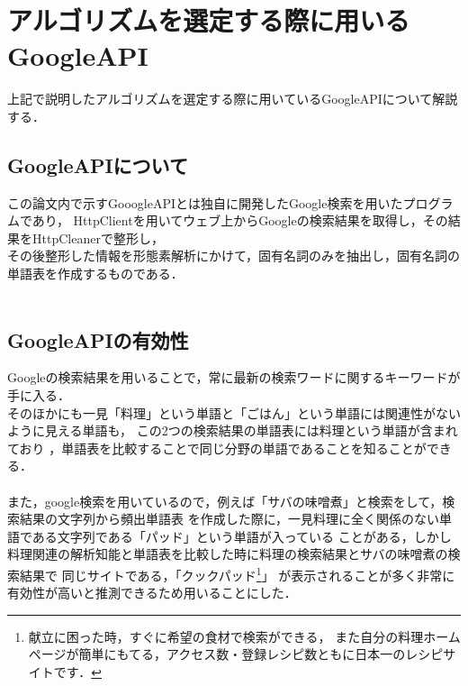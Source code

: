 \section{アルゴリズムを選定する際に用いるGoogleAPI}
上記で説明したアルゴリズムを選定する際に用いているGoogleAPIについて解説する．\\

\subsection{GoogleAPIについて}
この論文内で示すGooogleAPIとは独自に開発したGoogle検索を用いたプログラムであり，
HttpClientを用いてウェブ上からGoogleの検索結果を取得し，その結果をHttpCleanerで整形し，\\
その後整形した情報を形態素解析にかけて，固有名詞のみを抽出し，固有名詞の単語表を作成するものである．\\
\\

\subsection{GoogleAPIの有効性}
Googleの検索結果を用いることで，常に最新の検索ワードに関するキーワードが手に入る．
\\
そのほかにも一見「料理」という単語と「ごはん」という単語には関連性がないように見える単語も，
この2つの検索結果の単語表には料理という単語が含まれており
，単語表を比較することで同じ分野の単語であることを知ることができる．\\
\\
また，google検索を用いているので，例えば「サバの味噌煮」と検索をして，検索結果の文字列から頻出単語表
を作成した際に，一見料理に全く関係のない単語である文字列である「パッド」という単語が入っている
ことがある，しかし料理関連の解析知能と単語表を比較した時に料理の検索結果とサバの味噌煮の検索結果で
同じサイトである，「クックパッド\footnote{献立に困った時，すぐに希望の食材で検索ができる，
また自分の料理ホームページが簡単にもてる，アクセス数・登録レシピ数ともに日本一のレシピサイトです．}」
が表示されることが多く非常に有効性が高いと推測できるため用いることにした．\\
